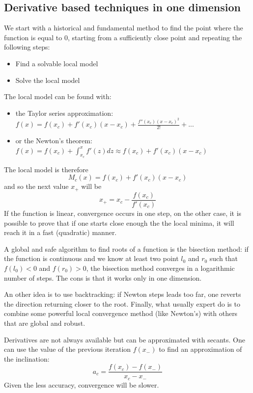 \documentclass[11pt]{article}
\begin{document}
\subsection{Derivative based techniques in one dimension}
We start with a historical and fundamental method to find the point where the function is equal to 0, starting from a sufficiently close point and repeating the following steps:
\begin{itemize}
\item{Find a solvable local model}
\item{Solve the local model}
\end{itemize}
The local model can be found with:
\begin{itemize}
\item{the Taylor series approximation: $ f(x) = f(x_{c}) + f'(x_{c}) (x - x_{c}) + \frac{f''(x_{c}) (x-x_{c})^2}{2!} + ...$ }
\item{or the Newton's theorem: $ f(x) = f(x_{c}) + \int_{x_{c}}^{x} f'(z) dz \approx f(x_{c}) + f'(x_{c}) (x - x_{c}) $ }
\end{itemize}
The local model is therefore $$ M_{c}(x) = f(x_{c}) + f'(x_{c}) (x - x_{c}) $$ and so the next value $x_{+}$ will be $$ x_{+} = x_{c} - \frac{f(x_{c})}{f'(x_{c})} $$ 
If the function is linear, convergence occurs in one step, on the other case, it is possible to prove that if one starts close enough the the local minima, it will reach it in a fast (quadratic) manner.
\par
A global and safe algorithm to find roots of a function is the bisection method: if the function is continuous and we know at least two point $l_{0}$ and $r_{0}$ such that $f(l_{0}) < 0$ and $f(r_{0}) > 0$, the bisection method converges in a logarithmic number of steps. The cons is that it works only in one dimension.
\par
An other idea is to use backtracking: if Newton steps leads too far, one reverts the direction returning closer to the root. Finally, what usually expert do is to combine some powerful local convergence method (like Newton's) with others that are global and robust.
\par
Derivatives are not always available but can be approximated with secants. One can use the value of the previous iteration $f(x_{-})$ to find an approximation of the inclination: $$ a_{c} = \frac{f(x_{c}) - f(x_{-})}{x_{c} - x_{-}} $$ Given the less accuracy, convergence will be slower. 
\end{document}
